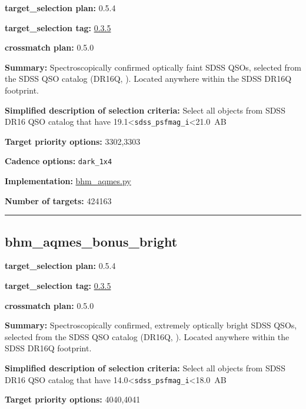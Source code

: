\noindent\textbf{target\_selection plan:} 0.5.4

\noindent\textbf{target\_selection tag:}
\href{https://github.com/sdss/target_selection/tree/0.3.5/}{0.3.5}

\noindent\textbf{crossmatch plan:} 0.5.0

\noindent\textbf{Summary:} Spectroscopically confirmed optically faint SDSS QSOs,
selected from the SDSS QSO catalog (DR16Q,
\citealt{Lyke2020}). Located anywhere within the SDSS DR16Q footprint.

\noindent\textbf{Simplified description of selection criteria:} Select all
objects from SDSS DR16 QSO catalog that have
19.1\textless{}\texttt{sdss\_psfmag\_i}\textless21.0~AB


\noindent\textbf{Target priority options:} 3302,3303

\noindent\textbf{Cadence options:} \texttt{dark\_1x4}

\noindent\textbf{Implementation:}
\href{https://github.com/sdss/target_selection/blob/0.3.5/python/target_selection/cartons/bhm_aqmes.py}{bhm\_aqmes.py}

\noindent\textbf{Number of targets:} 424163

\begin{center}\rule{0.5\linewidth}{0.5pt}\end{center}

\hypertarget{bhm_aqmes_bonus_bright_plan0.5.4}{%
\subsection{bhm\_aqmes\_bonus\_bright}\label{bhm_aqmes_bonus_bright_plan0.5.4}}

\noindent\textbf{target\_selection plan:} 0.5.4

\noindent\textbf{target\_selection tag:}
\href{https://github.com/sdss/target_selection/tree/0.3.5/}{0.3.5}

\noindent\textbf{crossmatch plan:} 0.5.0

\noindent\textbf{Summary:} Spectroscopically confirmed, extremely optically
bright SDSS QSOs, selected from the SDSS QSO catalog (DR16Q,
\citealt{Lyke2020}). Located anywhere within the SDSS DR16Q footprint.

\noindent\textbf{Simplified description of selection criteria:} Select all
objects from SDSS DR16 QSO catalog that have
14.0\textless{}\texttt{sdss\_psfmag\_i}\textless18.0~AB


\noindent\textbf{Target priority options:} 4040,4041

